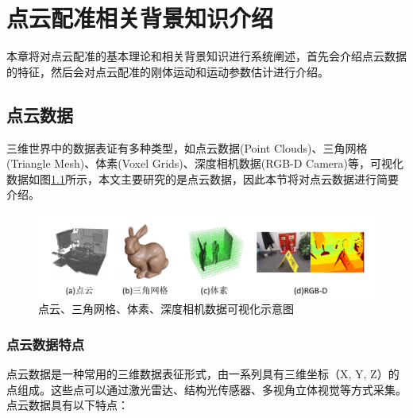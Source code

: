 %
%
%
%
%

\chapter{点云配准相关背景知识介绍}
本章将对点云配准的基本理论和相关背景知识进行系统阐述，首先会介绍点云数据的特征，然后会对点云配准的刚体运动和运动参数估计进行介绍。

\section{点云数据}
三维世界中的数据表证有多种类型，如点云数据(Point Clouds)\cite{leberl2010point}、三角网格(Triangle Mesh)\cite{jiang2020local}、体素(Voxel Grids)\cite{guan2020voxel}、深度相机数据(RGB-D Camera)\cite{cruz2012kinect}等，可视化数据如图\ref{fig:3ddata}所示，本文主要研究的是点云数据，因此本节将对点云数据进行简要介绍。

\begin{figure}[ht]
    \vspace{-8mm}
    \includegraphics[width=\textwidth]{images/3ddata.pdf}
    \caption{点云、三角网格、体素、深度相机数据可视化示意图}
    \label{fig:3ddata}
    \vspace{-10mm}
\end{figure}


\subsection{点云数据特点}
点云数据是一种常用的三维数据表征形式，由一系列具有三维坐标（X, Y, Z）的点组成。这些点可以通过激光雷达、结构光传感器、多视角立体视觉等方式采集。点云数据具有以下特点：

